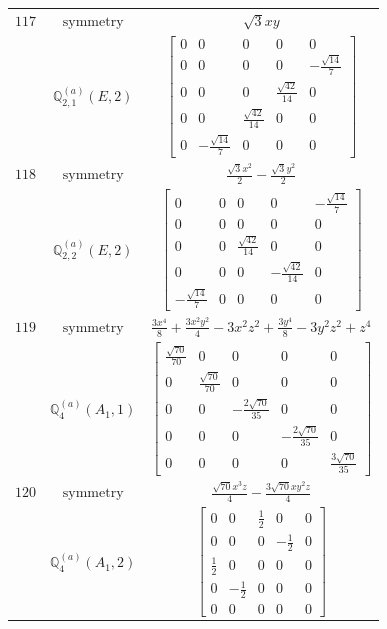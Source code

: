 \documentclass[fleqn,8pt,landscape]{jsarticle}
\begin{document}
\begin{longtable}{ccc}
$ 117 $ & $ \text{symmetry} $ & $ \sqrt{3} x y $ \\
$  $ & $ \mathbb{Q}_{2,1}^{(a)}(E,2) $ & $ \begin{bmatrix} 0 & 0 & 0 & 0 & 0 \\ 0 & 0 & 0 & 0 & - \frac{\sqrt{14}}{7} \\ 0 & 0 & 0 & \frac{\sqrt{42}}{14} & 0 \\ 0 & 0 & \frac{\sqrt{42}}{14} & 0 & 0 \\ 0 & - \frac{\sqrt{14}}{7} & 0 & 0 & 0 \end{bmatrix} $ \\ \hline
$ 118 $ & $ \text{symmetry} $ & $ \frac{\sqrt{3} x^{2}}{2} - \frac{\sqrt{3} y^{2}}{2} $ \\
$  $ & $ \mathbb{Q}_{2,2}^{(a)}(E,2) $ & $ \begin{bmatrix} 0 & 0 & 0 & 0 & - \frac{\sqrt{14}}{7} \\ 0 & 0 & 0 & 0 & 0 \\ 0 & 0 & \frac{\sqrt{42}}{14} & 0 & 0 \\ 0 & 0 & 0 & - \frac{\sqrt{42}}{14} & 0 \\ - \frac{\sqrt{14}}{7} & 0 & 0 & 0 & 0 \end{bmatrix} $ \\ \hline
$ 119 $ & $ \text{symmetry} $ & $ \frac{3 x^{4}}{8} + \frac{3 x^{2} y^{2}}{4} - 3 x^{2} z^{2} + \frac{3 y^{4}}{8} - 3 y^{2} z^{2} + z^{4} $ \\
$  $ & $ \mathbb{Q}_{4}^{(a)}(A_{1},1) $ & $ \begin{bmatrix} \frac{\sqrt{70}}{70} & 0 & 0 & 0 & 0 \\ 0 & \frac{\sqrt{70}}{70} & 0 & 0 & 0 \\ 0 & 0 & - \frac{2 \sqrt{70}}{35} & 0 & 0 \\ 0 & 0 & 0 & - \frac{2 \sqrt{70}}{35} & 0 \\ 0 & 0 & 0 & 0 & \frac{3 \sqrt{70}}{35} \end{bmatrix} $ \\ \hline
$ 120 $ & $ \text{symmetry} $ & $ \frac{\sqrt{70} x^{3} z}{4} - \frac{3 \sqrt{70} x y^{2} z}{4} $ \\
$  $ & $ \mathbb{Q}_{4}^{(a)}(A_{1},2) $ & $ \begin{bmatrix} 0 & 0 & \frac{1}{2} & 0 & 0 \\ 0 & 0 & 0 & - \frac{1}{2} & 0 \\ \frac{1}{2} & 0 & 0 & 0 & 0 \\ 0 & - \frac{1}{2} & 0 & 0 & 0 \\ 0 & 0 & 0 & 0 & 0 \end{bmatrix} $ \\ \hline

\end{longtable}
\end{document}
